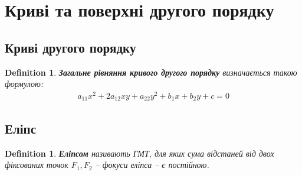 \documentclass[a4paper, 10pt]{extarticle}
\theoremstyle{theoremdd}
\theoremstyle{theoremdd}
\newtheorem{definition}[theorem]{Definition}
\theoremstyle{theoremdd}
\theoremstyle{theoremdd}
\theoremstyle{theoremdd}
\theoremstyle{theoremdd}
\theoremstyle{theoremdd}
\theoremstyle{theoremdd}
\begin{document}
\section{Криві та поверхні другого порядку}
\subsection*{Криві другого порядку}
\begin{definition}
\textbf{Загальне рівняння кривого другого порядку} визначається такою формулою:
\begin{align*}
a_{11}x^2 + 2a_{12}xy + a_{22}y^2 + b_1x+b_2y+c=0
\end{align*}
\end{definition}

\subsection{Еліпс}
\begin{definition}
\textbf{Еліпсом} називають ГМТ, для яких сума відстаней від двох фіксованих точок $F_1,F_2$ -- фокуси еліпса -- є постійною.
\begin{figure}[H]
\centering
{}
\end{figure}
\end{definition}
\end{document}
